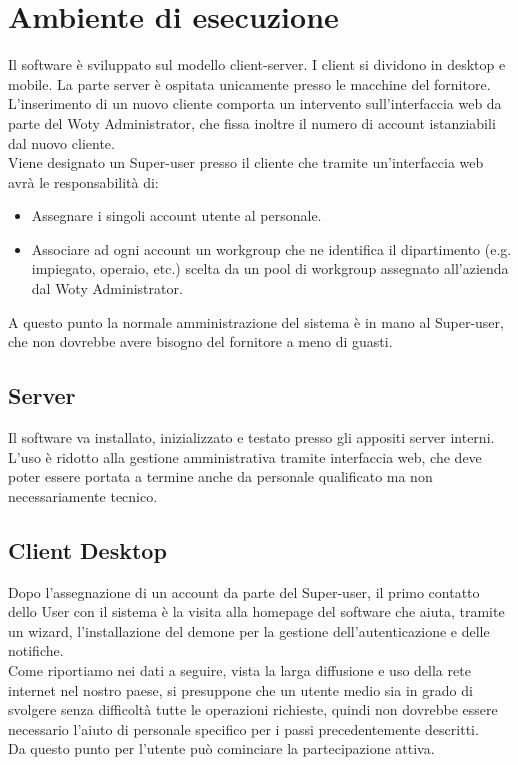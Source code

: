 \section{Ambiente di esecuzione}
Il software è sviluppato sul modello client-server. I client si dividono in desktop e mobile. La parte server è ospitata unicamente presso le macchine del fornitore.\\
L'inserimento di un nuovo cliente comporta un intervento sull'interfaccia web da parte del Woty Administrator, che fissa inoltre il numero di account istanziabili dal nuovo cliente.\\
Viene designato un Super-user presso il cliente che tramite un'interfaccia web avrà le responsabilità di:
\begin{itemize}
\item{ Assegnare i singoli account utente al personale. }
\item{ Associare ad ogni account un workgroup che ne identifica il dipartimento (e.g. impiegato, operaio, etc.) scelta da un pool di workgroup assegnato all'azienda dal Woty Administrator. }
\end{itemize}

A questo punto la normale amministrazione del sistema è in mano al Super-user, che non dovrebbe avere bisogno del fornitore a meno di guasti.

\subsection{Server}
Il software va installato, inizializzato e testato presso gli appositi server interni.\\
L'uso è ridotto alla gestione amministrativa tramite interfaccia web, che deve poter essere portata a termine anche da personale qualificato ma non necessariamente tecnico.

\newpage

\subsection{Client Desktop}
Dopo l'assegnazione di un account da parte del Super-user, il primo contatto dello User con il sistema è la visita alla homepage del software che aiuta, tramite un wizard, l'installazione del demone per la gestione dell'autenticazione e delle notifiche.\\
Come riportiamo nei dati a seguire, vista la larga diffusione e uso della rete internet nel nostro paese, si presuppone che un utente medio sia in grado di svolgere senza difficoltà tutte le operazioni richieste, quindi non dovrebbe essere necessario l'aiuto di personale specifico per i passi precedentemente descritti.\\
Da questo punto per l'utente può cominciare la partecipazione attiva.\\


